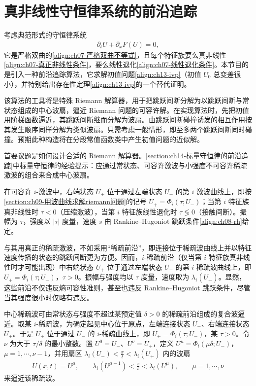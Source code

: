 \documentclass[../../main.tex]{subfiles}
\begin{document}
\section{真非线性守恒律系统的前沿追踪}\label{section:ch14-真非线性系统的前沿追踪}

考虑典范形式的守恒律系统
\begin{align}
\partial_t U+\partial_x F(U)=0,
\label{align:ch14-system}
\end{align}
它是严格双曲的\eqref{align:ch07-严格双曲不等式}，且每个特征族要么真非线性\eqref{align:ch07-真正非线性条件}，要么线性退化\eqref{align:ch07-线性退化条件}。本节目的是引入一种前沿追踪算法，它求解初值问题\eqref{align:ch13-ivp}（初值 $U_0$ 总变差很小），并特别给出存在性定理\eqref{align:ch13-ivp}的一个替代证明。



该算法的工具将是特殊 Riemann 解算器，用于把跳跃间断分解为以跳跃间断与常状态组成的中心波扇，逼近 Riemann 问题的可容许解。在实现算法时，先把初值用阶梯函数逼近，其跳跃间断继而分解为波扇。由跳跃间断碰撞诱发的相互作用按其发生顺序同样分解为类似波扇。只需考虑一般情形，即至多两个跳跃间断同时碰撞。预期此种构造将在分段常值函数类中产生初值问题的近似解。

首要议题是如何设计合适的 Riemann 解算器。\cref{section:ch14-标量守恒律的前沿追踪}中标量守恒律的经验提示：应通过常状态、可容许激波与小强度不可容许稀疏激波的组合来合成中心波扇。

在可容许 $i$-激波中，右端状态 $U_+$ 位于通过左端状态 $U_-$ 的第 $i$ 激波曲线上，即按\cref{section:ch09-用波曲线求解riemann问题}的记号 $U_+=\Phi_i(\tau;U_-)$；当第 $i$ 特征族真非线性时 $\tau<0$（压缩激波），当第 $i$ 特征族线性退化时 $\tau\lessgtr0$（接触间断）。振幅为 $\tau$，强度以 $|\tau|$ 度量，速度 $s$ 由 Rankine--Hugoniot 跳跃条件\eqref{align:ch08-rh}给定。



与其用真正的稀疏激波，不如采用``稀疏前沿''，即连接位于稀疏波曲线上并以特征速度传播的状态的跳跃间断更为方便。因而，$i$-稀疏前沿（仅当第 $i$ 特征族真非线性时才可能出现）中右端状态 $U_+$ 位于通过左端状态 $U_-$ 的第 $i$ 稀疏波曲线上，即 $U_+=\Phi_i(\tau;U_-)$，$\tau>0$。振幅与强度均以 $\tau$ 度量，速度取为 $\lambda_i(U_+)$。显然，这些前沿不仅违反熵可容性准则，甚至也违反 Rankine--Hugoniot 跳跃条件，尽管当其强度很小时仅略有违反。

中心稀疏波可由常状态与强度不超过某预定值 $\delta>0$ 的稀疏前沿组成的复合波逼近。取某 $i$-稀疏波，为确定起见中心位于原点，左端连接状态 $U_-$、右端连接状态 $U_+$。于是 $U_+$ 位于通过 $U_-$ 的 $i$-稀疏曲线上，即 $U_+=\Phi_i(\tau;U_-)$，某 $\tau>0$。令 $\nu$ 为大于 $\tau/\delta$ 的最小整数。置 $U^0=U_-$、$U^\nu=U_+$，定义 $U^\mu=\Phi_i(\mu\delta;U_-)$，$\mu=1,\cdots,\nu-1$，并用扇区 $\lambda_i(U_-)<\frac{x}{t}<\lambda_i(U_+)$ 内的波扇
\begin{align}
U(x,t)=U^\mu,\qquad \lambda_i(U^{\mu-1})<\frac{x}{t}<\lambda_i(U^\mu),\qquad \mu=1,\cdots,\nu
\label{align:ch14-rarefaction-fan}
\end{align}
来逼近该稀疏波。
\end{document}

